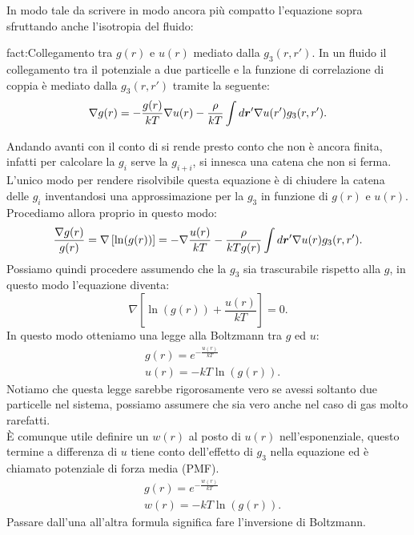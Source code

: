 In modo tale da scrivere in modo ancora più compatto l'equazione sopra sfruttando anche l'isotropia del fluido:
\begin{fact}{fact:Collegamento tra $g(r)$ e $u(r)$ mediato dalla $g_3(r,r')$.}
	In un fluido il collegamento tra il potenziale a due particelle e la funzione 
	di correlazione di coppia è mediato dalla $g_3(r,r')$ tramite la seguente:
	\[
	\nabla g(r) = -\frac{g(r)}{kT} \nabla u(r)
	- \frac{\rho }{kT}\int d \boldsymbol{r}'\nabla u(r')g_3(r,r')
	.\] 
\end{fact}
Andando avanti con il conto di si rende presto conto che non è ancora finita, infatti per calcolare la $g_i$ serve la $g_{i+i}$, si innesca una catena che non si ferma. L'unico modo per rendere risolvibile questa equazione è di chiudere la catena delle $g_i$ inventandosi una approssimazione per la $g_3$ in funzione di $g(r)$ e $u(r)$. Procediamo allora proprio in questo modo:
\[
	\frac{\nabla g(r)}{g(r)}
	=
	\nabla\left[ \ln(g(r)) \right] 
	=
	- \nabla  \frac{u(r)}{kT} 
	-
	\frac{\rho }{kT g(r)} \int d \boldsymbol{r}' \nabla u(r)g_3(r,r')
.\] 
Possiamo quindi procedere assumendo che la $g_3$ sia trascurabile rispetto alla $g$, in questo modo l'equazione diventa:
\[
	\nabla\left[ \ln(g(r))+\frac{u(r)}{kT} \right] = 0
.\] 
In questo modo otteniamo una legge alla Boltzmann tra $g$ ed $u$:
\[\begin{aligned}
	& g(r) = e^{-\frac{u(r)}{kT}}\\
	& u(r) = - kT\ln (g(r))
.\end{aligned}\]
Notiamo che questa legge sarebbe rigorosamente vero se avessi soltanto due particelle nel sistema, possiamo assumere che sia vero anche nel caso di gas molto rarefatti.\\
È comunque utile definire un $w(r)$ al posto di $u(r)$ nell'esponenziale, questo termine a differenza di $u$ tiene conto dell'effetto di $g_3$ nella equazione ed è chiamato potenziale di forza media (PMF).
\[\begin{aligned}
	& g(r) = e^{-\frac{w(r)}{kT}}\\
	& w(r) = - kT\ln (g(r))
.\end{aligned}\]
Passare dall'una all'altra formula significa fare l'inversione di Boltzmann.
